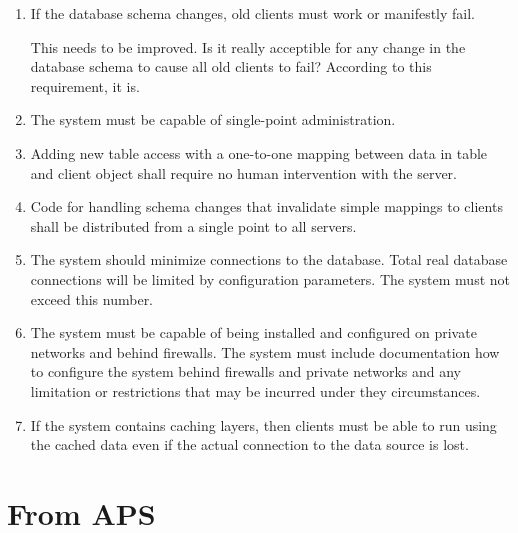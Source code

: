 \begin{enumerate}
\item

If the database schema changes, old clients must work or manifestly
fail. 

\begin{fixme}
This needs to be improved. Is it really acceptible for
any change in the database schema to cause all old clients to fail?
According to this requirement, it is.
\end{fixme}

\item

The system must be capable of single-point administration.

\item

Adding new table access with a one-to-one mapping between data in
table and client object shall require no human intervention with the
server.

\item

Code for handling schema changes that invalidate simple mappings to
clients shall be distributed from a single point to all servers.

\item

The system should minimize connections to the database. Total real
database connections will be limited by configuration parameters. The
\frontier system must not exceed this number.

\item

The system must be capable of being installed and configured on
private networks and behind firewalls. The system must include
documentation how to configure the system behind firewalls and private
networks and any limitation or restrictions that may be incurred under
they circumstances.

\item

If the system contains caching layers, then clients must be able to
run using the cached data even if the actual connection to the data
source is lost.

\end{enumerate}

\section{From APS}

